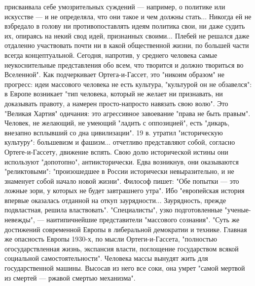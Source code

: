 \documentclass[12pt]{article}
\begin{document}
присваивала себе умозрительных суждений — например, о политике или искусстве — и не определяла, что они
такое и чем должны стать... Никогда ей не взбредало в голову ни противопоставлять идеям политика свои, ни
даже судить их, опираясь на некий свод идей, признанных своими... Плебей не решался даже отдаленно
участвовать почти ни в какой общественной жизни, по большей части всегда концептуальной. Сегодня,
напротив, у среднего человека самые неукоснительные представления обо всем, что творится и должно
твориться во Вселенной". Как подчеркивает Ортега-и-Гассет, это "никоим образом" не прогресс: идеи массового
человека не есть культура, "культурой он не обзавелся": в Европе возникает "тип человека, который не желает
ни признавать, ни доказывать правоту, а намерен просто-напросто навязать свою волю". Это "Великая Хартия"
одичания: это агрессивное завоевание "права не быть правым". Человек, не желающий, не умеющий "ладить с
оппозицией", есть "дикарь, внезапно всплывший со дна цивилизации". 19 в. утратил "историческую культуру":
большевизм и фашизм... отчетливо представляют собой, согласно Ортеге-и-Гассету, движение вспять. Свою
долю исторической истины они используют "допотопно", антиисторически. Едва возникнув, они оказываются
"реликтовыми": "произошедшее в России исторически невыразительно, и не знаменует собой начало новой
жизни". Философ пишет: "Обе попытки — это ложные зори, у которых не будет завтрашнего утра". Ибо
"европейская история впервые оказалась отданной на откуп заурядности... Заурядность, прежде подвластная,
решила властвовать". "Специалисты", узко подготовленные "ученые-невежды", — наитипичнейшие
представители "массового сознания". "Суть же достижений современной Европы в либеральной демократии и
технике. Главная же опасность Европы 1930-х, по мысли Ортеги-и-Гассета, "полностью огосударствленная
жизнь, экспансия власти, поглощение государством всякой социальной самостоятельности". Человека массы
вынудят жить для государственной машины. Высосав из него все соки, она умрет "самой мертвой из смертей —
ржавой смертью механизма".
\end{document}

